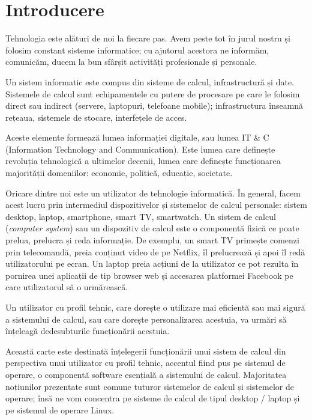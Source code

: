 \chapter{Introducere}
\label{chapter:intro}

Tehnologia este alături de noi la fiecare pas. Avem peste tot în jurul nostru și folosim constant sisteme informatice; cu ajutorul acestora ne informăm, comunicăm, ducem la bun sfârșit activități profesionale și personale.

Un sistem informatic este compus din sisteme de calcul, infrastructură și date. Sistemele de calcul sunt echipamentele cu putere de procesare pe care le folosim direct sau indirect (servere, laptopuri, telefoane mobile); infrastructura înseamnă rețeaua, sistemele de stocare, interfețele de acces.

Aceste elemente formează lumea informației digitale, sau lumea IT \& C (Information Technology and Communication). Este lumea care definește revoluția tehnologică a ultimelor decenii, lumea care definește funcționarea majorității domeniilor: economie, politică, educație, societate.

Oricare dintre noi este un utilizator de tehnologie informatică. În general, facem acest lucru prin intermediul dispozitivelor și sistemelor de calcul personale: sistem desktop, laptop, smartphone, smart TV, smartwatch. Un sistem de calcul (\textit{computer system}) sau un dispozitiv de calcul este o componentă fizică ce poate prelua, prelucra și reda informație. De exemplu, un smart TV primește comenzi prin telecomandă, preia conținut video de pe Netflix, îl prelucrează și apoi îl redă utilizatorului pe ecran. Un laptop preia acțiuni de la utilizator ce pot rezulta în pornirea unei aplicații de tip browser web și accesarea platformei Facebook pe care utilizatorul să o urmărească.

Un utilizator cu profil tehnic, care dorește o utilizare mai eficientă sau mai sigură a sistemului de calcul, sau care dorește personalizarea acestuia, va urmări să înțeleagă dedesubturile funcționării acestuia.

Această carte este destinată înțelegerii funcționării unui sistem de calcul din perspectiva unui utilizator cu profil tehnic, accentul fiind pus pe sistemul de operare, o componentă software esențială a sistemului de calcul. Majoritatea noțiunilor prezentate sunt comune tuturor sistemelor de calcul și sistemelor de operare; însă ne vom concentra pe sisteme de calcul de tipul desktop / laptop și pe sistemul de operare Linux.

